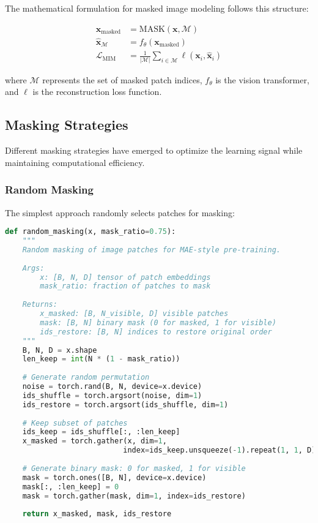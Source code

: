 The mathematical formulation for masked image modeling follows this structure:

\begin{align}
\mathbf{x}_{\text{masked}} &= \text{MASK}(\mathbf{x}, \mathcal{M}) \\
\hat{\mathbf{x}}_{\mathcal{M}} &= f_{\theta}(\mathbf{x}_{\text{masked}}) \\
\mathcal{L}_{\text{MIM}} &= \frac{1}{|\mathcal{M}|} \sum_{i \in \mathcal{M}} \ell(\mathbf{x}_i, \hat{\mathbf{x}}_i)
\end{align}

where $\mathcal{M}$ represents the set of masked patch indices, $f_{\theta}$ is the vision transformer, and $\ell$ is the reconstruction loss function.

\subsection{Masking Strategies}

Different masking strategies have emerged to optimize the learning signal while maintaining computational efficiency.

\subsubsection{Random Masking}

The simplest approach randomly selects patches for masking:

\begin{lstlisting}[language=Python, caption=Random masking implementation for vision transformers]
def random_masking(x, mask_ratio=0.75):
    """
    Random masking of image patches for MAE-style pre-training.
    
    Args:
        x: [B, N, D] tensor of patch embeddings
        mask_ratio: fraction of patches to mask
    
    Returns:
        x_masked: [B, N_visible, D] visible patches
        mask: [B, N] binary mask (0 for masked, 1 for visible)
        ids_restore: [B, N] indices to restore original order
    """
    B, N, D = x.shape
    len_keep = int(N * (1 - mask_ratio))
    
    # Generate random permutation
    noise = torch.rand(B, N, device=x.device)
    ids_shuffle = torch.argsort(noise, dim=1)
    ids_restore = torch.argsort(ids_shuffle, dim=1)
    
    # Keep subset of patches
    ids_keep = ids_shuffle[:, :len_keep]
    x_masked = torch.gather(x, dim=1, 
                           index=ids_keep.unsqueeze(-1).repeat(1, 1, D))
    
    # Generate binary mask: 0 for masked, 1 for visible
    mask = torch.ones([B, N], device=x.device)
    mask[:, :len_keep] = 0
    mask = torch.gather(mask, dim=1, index=ids_restore)
    
    return x_masked, mask, ids_restore
\end{lstlisting}

